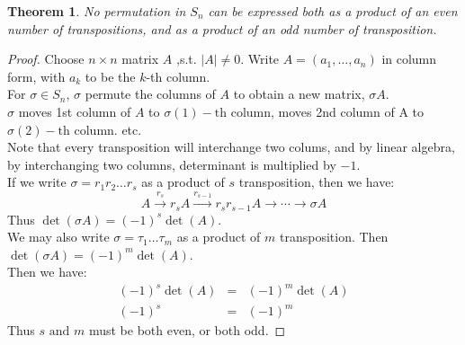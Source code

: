 \documentclass{article}
\theoremstyle{MyNonumberplain}
\theoremstyle{break}
\newtheorem*{proof}{Proof. }
\newcommand{\infixand}{\text{ and }}
\newcommand{\tmop}{\text}
\theoremstyle{break}
\newtheorem{theorem}{Theorem}[section]
\theoremstyle{break}
\theoremstyle{definition}
\theoremstyle{break}
\begin{document}
\begin{thmbox}
    \begin{theorem}
        No permutation in $S_n$ can be expressed both as a product of an even number of transpositions, and as a product of an odd number of transposition.
    \end{theorem}

    \begin{prfbox}
        \begin{proof}
            Choose $n \times n$ matrix $A$ ,s.t. $| A | \neq 0$. Write $A = (a_1, \ldots,
            a_n)$ in column form, with $a_k$ to be the $k$-th column.\\

            For $\sigma \in S_n$, $\sigma$ permute the columns of $A$ to obtain a new
            matrix, $\sigma A$.\\

            $\sigma$ moves 1st column of $A$ to $\sigma (1) - \tmop{th}$ column, moves 2nd
            column of A to $\sigma (2) - \tmop{th}$ column. etc.\\

            Note that every transposition will interchange two colums, and by linear
            algebra, by interchanging two columns, determinant is multiplied by $- 1$.\\

            If we write $\sigma = r_1 r_2 \ldots r_s$ as a product of $s$ transposition,
            then we have:
            \[ A \xrightarrow{r_s} r_s A \xrightarrow{r_{s - 1}} r_s r_{s - 1} A
            \rightarrow \cdots \rightarrow \sigma A \]
            Thus $\det (\sigma A) = (- 1)^s \det (A)$.\\

            We may also write $\sigma = \tau_1 \ldots \tau_m$ as a product of $m$
            transposition. Then $\det (\sigma A) = (- 1)^m \det (A)$.\\

            Then we have:
            \begin{eqnarray*}
            (- 1)^s \det (A) & = & (- 1)^m \det (A)\\
            (- 1)^s & = & (- 1)^m
            \end{eqnarray*}
            Thus $s \infixand m$ must be both even, or both odd.
        \end{proof}
    \end{prfbox}
\end{thmbox}
\end{document}
